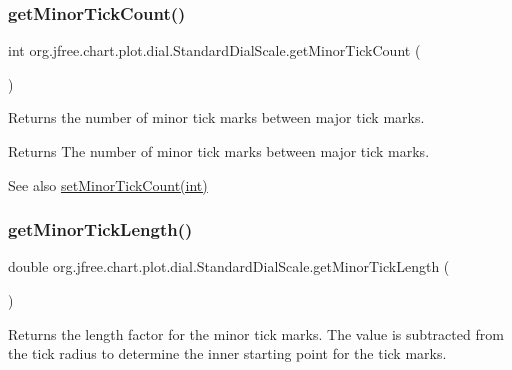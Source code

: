 \subsubsection{\texorpdfstring{get\+Minor\+Tick\+Count()}{getMinorTickCount()}}
{\footnotesize\ttfamily int org.\+jfree.\+chart.\+plot.\+dial.\+Standard\+Dial\+Scale.\+get\+Minor\+Tick\+Count (\begin{DoxyParamCaption}{ }\end{DoxyParamCaption})}

Returns the number of minor tick marks between major tick marks.

\begin{DoxyReturn}{Returns}
The number of minor tick marks between major tick marks.
\end{DoxyReturn}
\begin{DoxySeeAlso}{See also}
\mbox{\hyperlink{classorg_1_1jfree_1_1chart_1_1plot_1_1dial_1_1_standard_dial_scale_a904e2576fc1d5d1a2e17cc67a51adca5}{set\+Minor\+Tick\+Count(int)}} 
\end{DoxySeeAlso}
\mbox{\label{classorg_1_1jfree_1_1chart_1_1plot_1_1dial_1_1_standard_dial_scale_aee13f2cda92a34a11e9424428099f796}} 
\subsubsection{\texorpdfstring{get\+Minor\+Tick\+Length()}{getMinorTickLength()}}
{\footnotesize\ttfamily double org.\+jfree.\+chart.\+plot.\+dial.\+Standard\+Dial\+Scale.\+get\+Minor\+Tick\+Length (\begin{DoxyParamCaption}{ }\end{DoxyParamCaption})}

Returns the length factor for the minor tick marks. The value is subtracted from the tick radius to determine the inner starting point for the tick marks.

